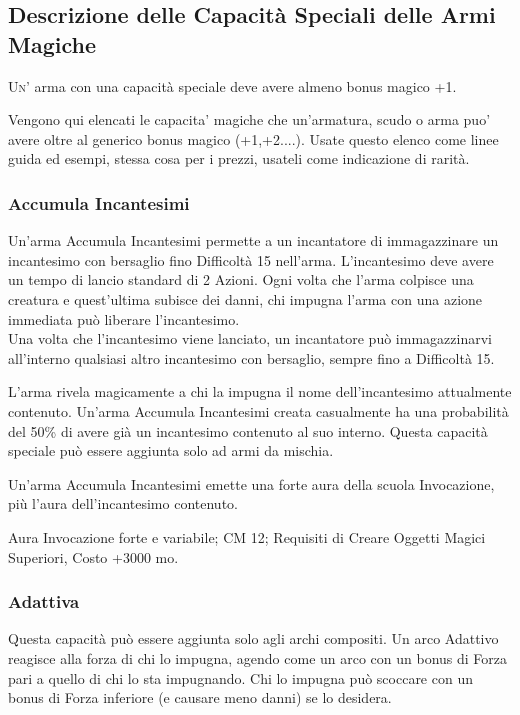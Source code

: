 \subsection{Descrizione delle Capacità Speciali delle Armi Magiche}

\lettrine[lines=2, lhang=0.33, loversize=0.25, findent=1.5em]{U}{n'} arma con una capacità speciale deve avere almeno bonus magico +1.

Vengono qui elencati le capacita' magiche che un'armatura, scudo o arma puo' avere oltre al generico bonus magico (+1,+2....). Usate questo elenco come linee guida ed esempi, stessa cosa per i prezzi, usateli come indicazione di rarità.

\begin{multicols}{2}

\subsubsection{Accumula Incantesimi}

Un'arma Accumula Incantesimi permette a un incantatore di immagazzinare un incantesimo con bersaglio fino Difficoltà 15 nell'arma. L'incantesimo deve avere un tempo di lancio standard di 2 Azioni. Ogni volta che l'arma colpisce una creatura e quest'ultima subisce dei danni, chi impugna l'arma con una azione immediata può liberare l'incantesimo.\\
Una volta che l'incantesimo viene lanciato, un incantatore può immagazzinarvi all'interno qualsiasi altro incantesimo con bersaglio, sempre fino a Difficoltà 15.

L'arma rivela magicamente a chi la impugna il nome dell'incantesimo attualmente contenuto. Un'arma Accumula Incantesimi creata casualmente ha una probabilità del 50\% di avere già un incantesimo contenuto al suo interno. Questa capacità speciale può essere aggiunta solo ad armi da mischia.

Un'arma Accumula Incantesimi emette una forte aura della scuola Invocazione, più l'aura dell'incantesimo contenuto.

Aura Invocazione forte e variabile; CM 12; Requisiti di Creare Oggetti Magici Superiori, Costo +3000 mo.

\subsubsection{Adattiva}

Questa capacità può essere aggiunta solo agli archi compositi. Un arco Adattivo reagisce alla forza di chi lo impugna, agendo come un arco con un bonus di Forza pari a quello di chi lo sta impugnando. Chi lo impugna può scoccare con un bonus di Forza inferiore (e causare meno danni) se lo desidera.


\end{multicols}
